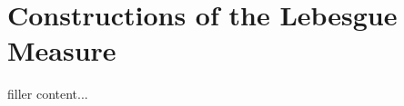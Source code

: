 \documentclass[../../templates/section]{subfiles}
\begin{document}
\section{Constructions of the Lebesgue Measure}\label{sec:constructions-of-the-lebesgue-measure}

filler content...
\end{document}
